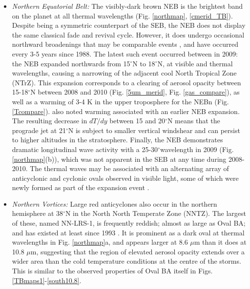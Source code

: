 \documentclass[final,5p,times,twocolumn,authoryear]{elsarticle}
\newcommand{\degree}{\ensuremath{^\circ}}
\begin{document}
\begin{itemize}
\item \textit{Northern Equatorial Belt: }  The visibly-dark brown NEB is the brightest band on the planet at all thermal wavelengths (Fig. \ref{northmap}, \ref{cmerid_TB}).  Despite being a symmetric counterpart of the SEB, the NEB does not display the same classical fade and revival cycle.  However, it does undergo occasional northward broadenings that may be comparable events \citep{94orton, 95rogers}, and have occurred every 3-5 years since 1988.  The latest such event occurred between in 2009:  the NEB expanded northwards from 15\degree N to 18\degree N, at visible and thermal wavelengths, causing a narrowing of the adjacent cool North Tropical Zone (NTrZ).  This expansion corresponds to a clearing of aerosol opacity between 15-18\degree N between 2008 and 2010 (Fig. \ref{5um_merid}, Fig. \ref{gas_compare}), as well as a warming of 3-4 K in the upper troposphere for the NEBn (Fig. \ref{Tcompare}).  \citet{94orton} also noted warming associated with an earlier NEB expansion.  The resulting decrease in $dT/dy$ between 15 and 20\degree N means that the prograde jet at 21\degree N is subject to smaller vertical windshear and can persist to higher altitudes in the stratosphere.  Finally, the NEB demonstrates dramatic longitudinal wave activity with a 25-30\degree wavelength in 2009 (Fig. \ref{northmap}(b)), which was not apparent in the SEB at any time during 2008-2010. The thermal waves may be associated with an alternating array of anticyclonic and cyclonic ovals observed in visible light, some of which were newly formed as part of the expansion event \citep{10rogers, 04rogers}.  


\item \textit{Northern Vortices: }  Large red anticyclones also occur in the northern hemisphere at 38$^\circ$N in the North North Temperate Zone (NNTZ).  The largest of these, named NN-LRS-1, is frequently reddish; almost as large as Oval BA; and has existed at least since 1993 \citep{11rogers_LRS}.  It is prominent as a dark oval at thermal wavelengths in Fig. \ref{northmap}a, and appears larger at 8.6 $\mu$m than it does at 10.8 $\mu$m, suggesting that the region of elevated aerosol opacity extends over a wider area than the cold temperature conditions at the centre of the storms.     This is similar to the observed properties of Oval BA itself in Figs. \ref{TBmaps1}-\ref{south10.8}.


\end{itemize}
\end{document}
